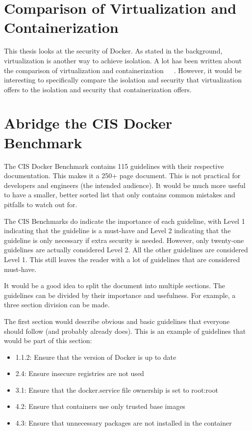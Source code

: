 \section{Comparison of Virtualization and Containerization}
This thesis looks at the security of Docker. As stated in the background, virtualization is another way to achieve isolation. A lot has been written about the comparison of virtualization and containerization~\cite{Virtualization-vs-Containerization-to-Support-PaaS}~\cite{Hypervisor-vs-Lightweight-Virtualization}~\cite{Updated-Performance-Comparison-Virtual-Machines-Containers}.
However, it would be interesting to specifically compare the isolation and security that virtualization offers to the isolation and security that containerization offers.

\section{Abridge the CIS Docker Benchmark}\label{futurework:CIS}
The CIS Docker Benchmark contains 115 guidelines with their respective documentation.
This makes it a 250+ page document. This is not practical for developers and engineers (the intended audience). It would be much more useful to have a smaller, better sorted list that only contains common mistakes and pitfalls to watch out for.

\medskip

The CIS Benchmarks do indicate the importance of each guideline, with Level 1 indicating that the guideline is a must-have and Level 2 indicating that the guideline is only necessary if extra security is needed. However, only twenty-one guidelines are actually considered Level 2. All the other guidelines are considered Level 1. This still leaves the reader with a lot of guidelines that are considered must-have.

\medskip

It would be a good idea to split the document into multiple sections. The guidelines can be divided by their importance and usefulness. For example, a three section division can be made.

\medskip

The first section would describe obvious and basic guidelines that everyone should follow (and probably already does). This is an example of guidelines that would be part of this section:
\begin{itemize}
    \item 1.1.2: Ensure that the version of Docker is up to date
    \item 2.4: Ensure insecure registries are not used
    \item 3.1: Ensure that the docker.service file ownership is set to root:root
    \item 4.2: Ensure that containers use only trusted base images
    \item 4.3: Ensure that unnecessary packages are not installed in the container
\end{itemize}

